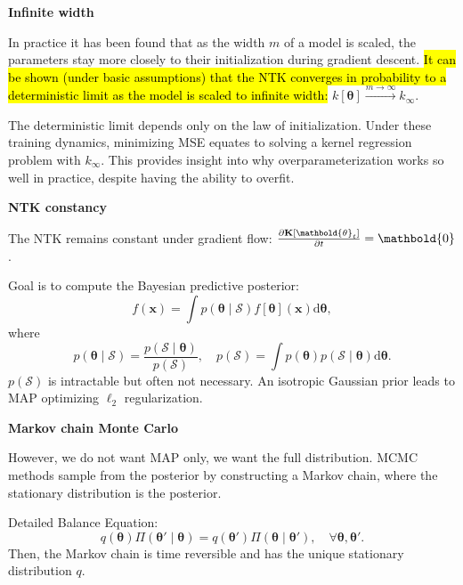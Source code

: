 \documentclass[10pt]{article}
\newenvironment{topic}[1]
{\textbf{\sffamily \footnotesize \colorbox{black}{\rlap{\textbf{\textcolor{white}{#1}}}\hspace{\linewidth}\hspace{-2\fboxsep}}}}
{}
\newenvironment{subtopic}[1]
{\begin{center}\textbf{\footnotesize \sffamily #1}\end{center}}
{}
\renewcommand{\mat}[1]{\ensuremath{\mathbf{#1}}}
\renewcommand{\vec}[1]{\ensuremath{\mathbold{#1}}}
\begin{document}
\begin{multicols*}{3}
\begin{topic}{Neural tangent kernel}
        \begin{subtopic}{Infinite width}
            In practice it has been found that as the width $m$ of a model is scaled, the parameters stay
            more closely to their initialization during gradient descent. \hl{It can be shown (under
            basic assumptions) that the NTK converges in probability to a deterministic limit as the
            model is scaled to infinite width:} $k[\vec{\theta}] \xrightarrow{m \to \infty} k_{\infty}$.

            The deterministic limit depends only on the law of initialization. Under these training dynamics,
            minimizing MSE equates to solving a kernel regression problem with $k_{\infty}$. This provides
            insight into why overparameterization works so well in practice, despite having the ability to
            overfit.
        \end{subtopic}

        \begin{subtopic}{NTK constancy}
            The NTK remains constant under gradient flow: $\pdv{\mat{K}[\vec{\theta}_t]}{t} = \vec{0}$.
        \end{subtopic}

    \end{topic}

    \begin{topic}{Bayesian learning}
        Goal is to compute the Bayesian predictive posterior: \[
            f(\vec{x}) = \int p(\vec{\theta} \mid \mathcal{S}) f[\vec{\theta}](\vec{x}) \mathrm{d}\vec{\theta},
        \]
        where \[
            p(\vec{\theta} \mid \mathcal{S}) = \frac{p(\mathcal{S} \mid \vec{\theta})}{p(\mathcal{S})}, \quad p(\mathcal{S}) = \int p(\vec{\theta}) p(\mathcal{S} \mid \vec{\theta}) \mathrm{d}\vec{\theta}.
        \]
        $p(\mathcal{S})$ is intractable but often not necessary. An isotropic Gaussian prior leads to MAP optimizing $\ell_2$ regularization.

        \begin{subtopic}{Markov chain Monte Carlo}
            However, we do not want MAP only, we want the full distribution. MCMC methods sample from
            the posterior by constructing a Markov chain, where the stationary distribution is the
            posterior.

            Detailed Balance Equation: \[
                q(\vec{\theta}) \Pi(\vec{\theta}' \mid \vec{\theta}) = q(\vec{\theta}') \Pi(\vec{\theta} \mid \vec{\theta}'), \quad \forall \vec{\theta}, \vec{\theta}'.
            \]
            Then, the Markov chain is time reversible and has the unique stationary distribution $q$.


\end{subtopic}
\end{topic}
\end{multicols*}
\end{document}
